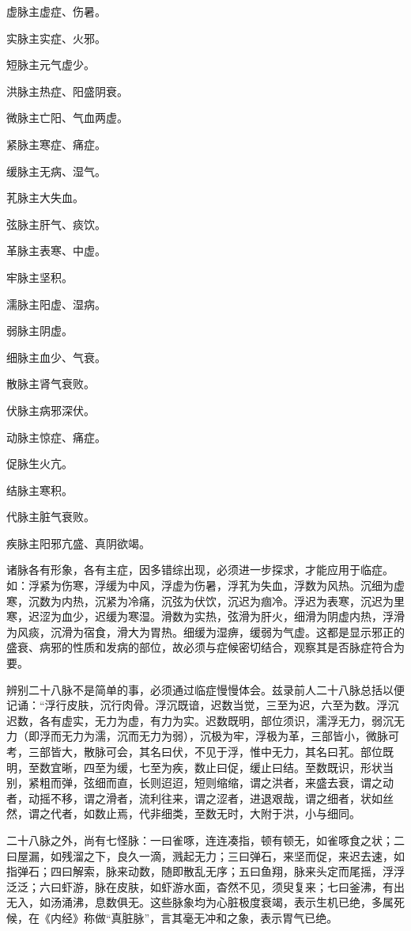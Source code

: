 \documentclass[12pt,UTF8]{ctexbook}
\begin{document}
虚脉主虚症、伤暑。

实脉主实症、火邪。

短脉主元气虚少。

洪脉主热症、阳盛阴衰。

微脉主亡阳、气血两虚。

紧脉主寒症、痛症。

缓脉主无病、湿气。

芤脉主大失血。

弦脉主肝气、痰饮。

革脉主表寒、中虚。

牢脉主坚积。

濡脉主阳虚、湿病。

弱脉主阴虚。

细脉主血少、气衰。

散脉主肾气衰败。

伏脉主病邪深伏。

动脉主惊症、痛症。

促脉生火亢。

结脉主寒积。

代脉主脏气衰败。

疾脉主阳邪亢盛、真阴欲竭。

诸脉各有形象，各有主症，因多错综出现，必须进一步探求，才能应用于临症。如：浮紧为伤寒，浮缓为中风，浮虚为伤暑，浮芤为失血，浮数为风热。沉细为虚寒，沉数为内热，沉紧为冷痛，沉弦为伏饮，沉迟为痼冷。浮迟为表寒，沉迟为里寒，迟涩为血少，迟缓为寒湿。滑数为实热，弦滑为肝火，细滑为阴虚内热，浮滑为风痰，沉滑为宿食，滑大为胃热。细缓为湿痹，缓弱为气虚。这都是显示邪正的盛衰、病邪的性质和发病的部位，故必须与症候密切结合，观察其是否脉症符合为要。

辨别二十八脉不是简单的事，必须通过临症慢慢体会。兹录前人二十八脉总括以便记诵：“浮行皮肤，沉行肉骨。浮沉既谙，迟数当觉，三至为迟，六至为数。浮沉迟数，各有虚实，无力为虚，有力为实。迟数既明，部位须识，濡浮无力，弱沉无力（即浮而无力为濡，沉而无力为弱），沉极为牢，浮极为革，三部皆小，微脉可考，三部皆大，散脉可会，其名曰伏，不见于浮，惟中无力，其名曰芤。部位既明，至数宜晰，四至为缓，七至为疾，数止曰促，缓止曰结。至数既识，形状当别，紧粗而弹，弦细而直，长则迢迢，短则缩缩，谓之洪者，来盛去衰，谓之动者，动摇不移，谓之滑者，流利往来，谓之涩者，进退艰哉，谓之细者，状如丝然，谓之代者，如数止焉，代非细类，至数无时，大附于洪，小与细同。

二十八脉之外，尚有七怪脉：一曰雀啄，连连凑指，顿有顿无，如雀啄食之状；二曰屋漏，如残溜之下，良久一滴，溅起无力；三曰弹石，来坚而促，来迟去速，如指弹石；四曰解索，脉来动数，随即散乱无序；五曰鱼翔，脉来头定而尾摇，浮浮泛泛；六曰虾游，脉在皮肤，如虾游水面，杳然不见，须臾复来；七曰釜沸，有出无入，如汤涌沸，息数俱无。这些脉象均为心脏极度衰竭，表示生机已绝，多属死候，在《内经》称做“真脏脉”，言其毫无冲和之象，表示胃气已绝。
\end{document}
